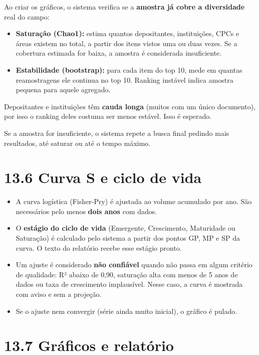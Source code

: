 \documentclass[
  brazilian,
  a4paper,12pt,oneside]{report}
\providecommand{\tightlist}{%
  \setlength{\itemsep}{0pt}\setlength{\parskip}{0pt}}
\begin{document}
Ao criar os gráficos, o sistema verifica se a \textbf{amostra já cobre a
diversidade} real do campo:

\begin{itemize}
\tightlist
\item
  \textbf{Saturação (Chao1):} estima quantos depositantes, instituições,
  CPCs e áreas existem no total, a partir dos itens vistos uma ou duas
  vezes. Se a cobertura estimada for baixa, a amostra é considerada
  insuficiente.
\item
  \textbf{Estabilidade (bootstrap):} para cada item do top 10, mede em
  quantas reamostragens ele continua no top 10. Ranking instável indica
  amostra pequena para aquele agregado.
\end{itemize}

Depositantes e instituições têm \textbf{cauda longa} (muitos com um
único documento), por isso o ranking deles costuma ser menos estável.
Isso é esperado.

Se a amostra for insuficiente, o sistema repete a busca final pedindo
mais resultados, até saturar ou até o tempo máximo.

\section{13.6 Curva S e ciclo de vida}\label{curva-s-e-ciclo-de-vida}

\begin{itemize}
\tightlist
\item
  A curva logística (Fisher-Pry) é ajustada ao volume acumulado por ano.
  São necessários pelo menos \textbf{dois anos} com dados.
\item
  O \textbf{estágio do ciclo de vida} (Emergente, Crescimento,
  Maturidade ou Saturação) é calculado pelo sistema a partir dos pontos
  GP, MP e SP da curva. O texto do relatório recebe esse estágio pronto.
\item
  Um ajuste é considerado \textbf{não confiável} quando não passa em
  algum critério de qualidade: R² abaixo de 0,90, saturação alta com
  menos de 5 anos de dados ou taxa de crescimento implausível. Nesse
  caso, a curva é mostrada com aviso e sem a projeção.
\item
  Se o ajuste nem convergir (série ainda muito inicial), o gráfico é
  pulado.
\end{itemize}

\section{13.7 Gráficos e relatório}\label{gruxe1ficos-e-relatuxf3rio}
\end{document}
